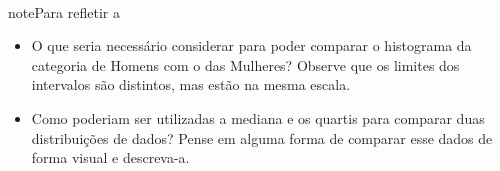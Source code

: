 \


\begin{sphinxadmonition}{note}{Para refletir}
a
\begin{itemize}
\item {} 
O que seria necessário considerar para poder comparar o histograma da categoria de Homens com o das Mulheres? Observe que os limites dos intervalos são distintos, mas estão na mesma escala.

\item {} 
Como poderiam ser utilizadas a mediana e os quartis para comparar duas distribuições de dados? Pense em alguma forma de comparar esse dados de forma visual e descreva-a.

\end{itemize}
\end{sphinxadmonition}

\label{\detokenize{PE104-2:ativ-comparacao-de-diferentes-grupos}}

